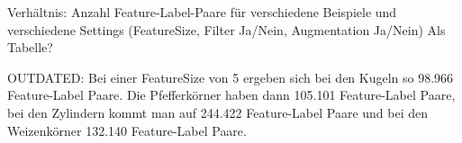 









\color{blue}
Verhältnis: Anzahl Feature-Label-Paare für verschiedene Beispiele und verschiedene Settings
(FeatureSize, Filter Ja/Nein, Augmentation Ja/Nein) Als Tabelle?

OUTDATED:
Bei einer FeatureSize von 5 ergeben sich bei den Kugeln so 98.966 Feature-Label Paare.
Die Pfefferkörner haben dann 105.101 Feature-Label Paare,
bei den Zylindern kommt man auf 244.422 Feature-Label Paare
und bei den Weizenkörner 132.140 Feature-Label Paare.
\color{black}
